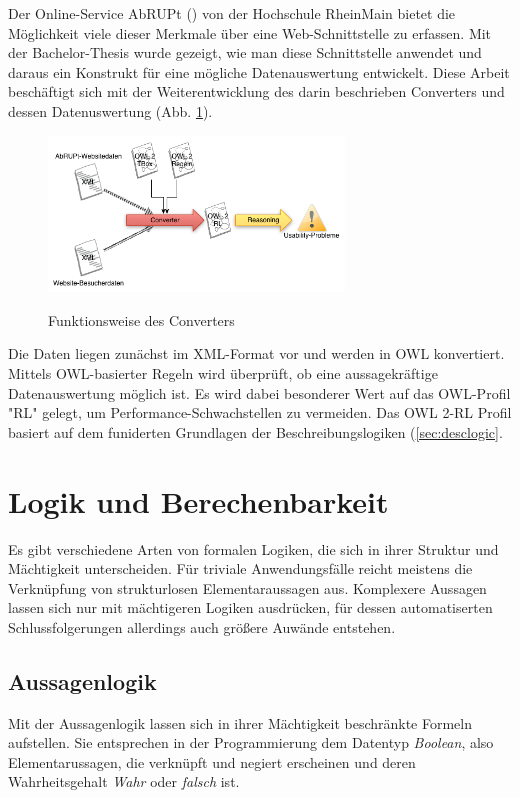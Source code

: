 \documentclass[runningheads,a4paper]{llncs}
\begin{document}
Der Online-Service AbRUPt (\cite{url_abrupt}) von der Hochschule RheinMain bietet die Möglichkeit viele dieser Merkmale über eine Web-Schnittstelle zu erfassen. 
Mit der Bachelor-Thesis \cite{Brieger} wurde gezeigt, wie man diese Schnittstelle anwendet und daraus ein Konstrukt für eine mögliche Datenauswertung entwickelt.
Diese Arbeit beschäftigt sich mit der Weiterentwicklung des darin beschrieben Converters und dessen Datenuswertung (Abb. \ref{fig:converter}).
\begin{figure}
\caption{Funktionsweise des Converters}
\centering
\includegraphics[width=0.7\textwidth]{figures/converter}
\label{fig:converter}
\end{figure}
Die Daten liegen zunächst im XML-Format vor und werden in OWL konvertiert.
Mittels OWL-basierter Regeln wird überprüft, ob eine aussagekräftige Datenauswertung möglich ist.
Es wird dabei besonderer Wert auf das OWL-Profil {}"RL{}" gelegt, um Performance-Schwachstellen zu vermeiden.
Das OWL 2-RL Profil basiert auf dem funiderten Grundlagen der Beschreibungslogiken (\ref{sec:desclogic}.

\newpage
\section{Logik und Berechenbarkeit}
\label{sec:logic}

Es gibt verschiedene Arten von formalen Logiken, die sich in ihrer Struktur und Mächtigkeit unterscheiden.
Für triviale Anwendungsfälle reicht meistens die Verknüpfung von strukturlosen Elementaraussagen aus.
Komplexere Aussagen lassen sich nur mit mächtigeren Logiken ausdrücken, für dessen automatiserten Schlussfolgerungen allerdings auch größere Auwände entstehen.

\subsection{Aussagenlogik}
\label{sec:aussagenlogik}

Mit der Aussagenlogik lassen sich in ihrer Mächtigkeit beschränkte Formeln aufstellen. Sie entsprechen in der Programmierung dem Datentyp \textit{Boolean}, also Elementarussagen, die verknüpft und negiert erscheinen und deren Wahrheitsgehalt \textit{Wahr} oder \textit{falsch} ist.
\end{document}
